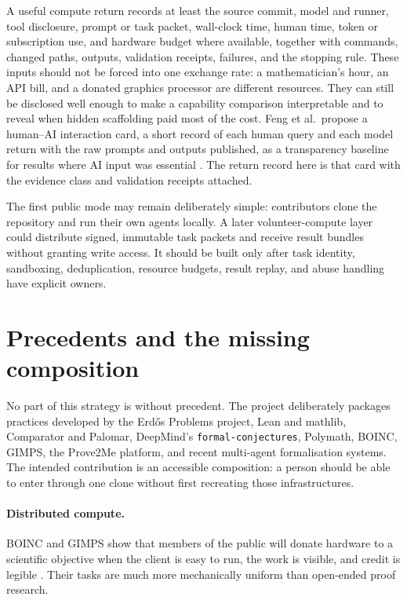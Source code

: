 \documentclass[10pt]{article}
\begin{document}
A useful compute return records at least the source commit, model and runner,
tool disclosure, prompt or task packet, wall-clock time, human time, token or
subscription use, and hardware budget where available, together with commands,
changed paths, outputs, validation receipts, failures, and the stopping rule.
These inputs should not be forced into one exchange rate: a mathematician's
hour, an API bill, and a donated graphics processor are different resources.
They can still be disclosed well enough to make a capability comparison
interpretable and to reveal when hidden scaffolding paid most of the cost.
Feng et al.\ propose a human--AI interaction card, a short record of each
human query and each model return with the raw prompts and outputs
published, as a transparency baseline for results where AI input was
essential \cite{autonomousmath}.  The return record here is that card with
the evidence class and validation receipts attached.

The first public mode may remain deliberately simple: contributors clone the
repository and run their own agents locally.  A later volunteer-compute layer
could distribute signed, immutable task packets and receive result bundles
without granting write access.  It should be built only after task identity,
sandboxing, deduplication, resource budgets, result replay, and abuse handling
have explicit owners.

\section{Precedents and the missing composition}\label{sec:prior}

No part of this strategy is without precedent.  The project deliberately
packages practices developed by the Erd\H{o}s Problems project, Lean and
mathlib, Comparator and Palomar, DeepMind's \texttt{formal-conjectures},
Polymath, BOINC, GIMPS, the Prove2Me platform, and recent multi-agent
formalisation systems.  The intended contribution is an accessible
composition: a person should be able to enter through one clone without
first recreating those infrastructures.

\paragraph{Distributed compute.}
BOINC and GIMPS show that members of the public will donate hardware to a
scientific objective when the client is easy to run, the work is visible, and
credit is legible \cite{boinc,gimps}.  Their tasks are much more mechanically
uniform than open-ended proof research.
\end{document}
